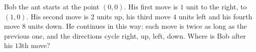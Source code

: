 Bob the ant starts at the point $(0,0)$. His first move is $1$ unit to the right, to $(1,0)$. His second move is $2$ units up, his third move $4$ units left and his fourth move $8$ units down. He continues in this way: each move is twice as long as the previous one, and the directions cycle right, up, left, down. Where is Bob after his $13$th move?
